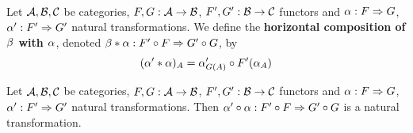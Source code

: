 \documentclass{book}
\begin{document}
	
	
	
	
	
	
	
	
	
	
	
	
	
	
	
	
	
	
	
	
	
	
	
	
	
	
	\begin{defn}   \\
		Let $\mathcal{A}, \mathcal{B}, \mathcal{C}$ be categories, $F, G:\mathcal{A} \rightarrow \mathcal{B}$, $F', G': \mathcal{B} \rightarrow \mathcal{C}$ functors and $\alpha: F \Rightarrow G$, $\alpha' : F' \Rightarrow G'$ natural transformations. We define the \textbf{horizontal composition of $\beta$ with $\alpha$}, denoted $\beta * \alpha: F' \circ F \Rightarrow G' \circ G$, by  
		$$(\alpha' * \alpha)_A = \alpha'_{G(A)} \circ F' (\alpha_A)$$ 
	\end{defn}
	
	
	\begin{ex} 
		Let $\mathcal{A}, \mathcal{B}, \mathcal{C}$ be categories, $F, G:\mathcal{A} \rightarrow \mathcal{B}$, $F', G': \mathcal{B} \rightarrow \mathcal{C}$ functors and $\alpha: F \Rightarrow G$, $\alpha' : F' \Rightarrow G'$ natural transformations. Then $ \alpha' \circ \alpha: F' \circ F \Rightarrow G' \circ G$ is a natural transformation.
	\end{ex}
	
\end{document}
